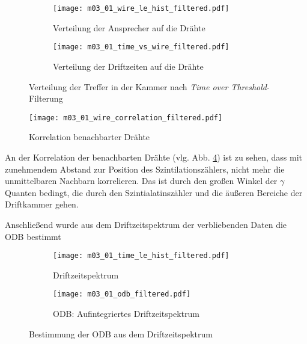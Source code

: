 \documentclass[11pt, ngerman, fleqn, DIV=15, headinclude, BCOR=2cm]{scrreprt}
\begin{document}
\begin{figure}
	\centering
	\begin{subfigure}{0.49 \linewidth}
		\texttt{[image: m03\_01\_wire\_le\_hist\_filtered.pdf]}
		\caption{%
			Verteilung der Ansprecher auf die Drähte
		}
		\label{fig:m03_wire_le_hist_filtered}
	\end{subfigure}
	\begin{subfigure}{0.49 \linewidth}
		\texttt{[image: m03\_01\_time\_vs\_wire\_filtered.pdf]}
		\caption{%
			Verteilung der Driftzeiten auf die Drähte
		}
		\label{fig:m03_time_vs_wire_filtered}
	\end{subfigure}
	\caption{%
		Verteilung der Treffer in der Kammer nach \emph{Time over
		Threshold}-Filterung
	}
	\label{fig:m03_verteilung_in_der_kammer_mit_ToT}
\end{figure}

\begin{figure}
	\centering
	\texttt{[image: m03\_01\_wire\_correlation\_filtered.pdf]}
	\caption{%
		Korrelation benachbarter Drähte
	}
	\label{fig:m03_wire_correlation}
\end{figure}

An der Korrelation der benachbarten Drähte (vlg. Abb.
\ref{fig:m03_wire_correlation}) ist zu sehen, dass mit zunehmendem Abstand zur
Position des Szintilationszählers, nicht mehr die unmittelbaren Nachbarn
korrelieren.
Das ist durch den großen Winkel der $\gamma$ Quanten bedingt, die durch den
Szintialatinszähler und die äußeren Bereiche der Driftkammer gehen.


Anschließend wurde aus dem Driftzeitspektrum der verbliebenden Daten die ODB bestimmt


\begin{figure}
	\centering
	\begin{subfigure}{0.49 \linewidth}
		\texttt{[image: m03\_01\_time\_le\_hist\_filtered.pdf]}
		\caption{%
			Driftzeitspektrum
		}
		\label{fig:m03_time_le_hist_filtered}
	\end{subfigure}
	\begin{subfigure}{0.49 \linewidth}
		\texttt{[image: m03\_01\_odb\_filtered.pdf]}
		\caption{%
			ODB: Aufintegriertes Driftzeitspektrum
		}
		\label{fig:m03_odb_filtered}
	\end{subfigure}
	\caption{%
		Bestimmung der ODB aus dem Driftzeitspektrum
	}
	\label{fig:m03_odb_bestimmung}
\end{figure}
\end{document}
